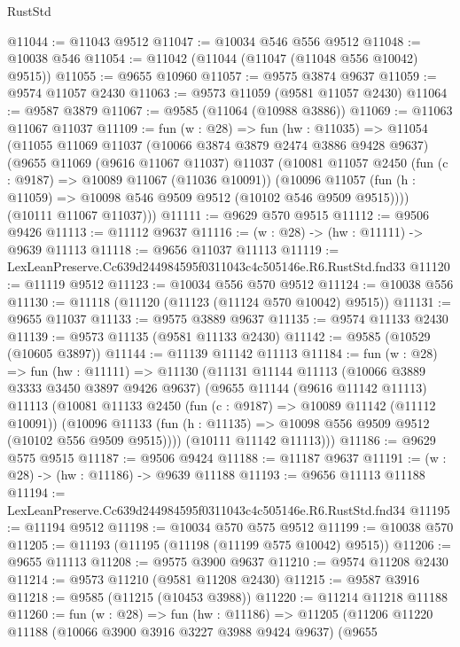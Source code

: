 \begin{lexlean}{RustStd}
\begin{coremodule}
@11044 := @11043 @9512
@11047 := @10034 @546 @556 @9512
@11048 := @10038 @546
@11054 := @11042 (@11044 (@11047 (@11048 @556 @10042) @9515))
@11055 := @9655 @10960
@11057 := @9575 @3874 @9637
@11059 := @9574 @11057 @2430
@11063 := @9573 @11059 (@9581 @11057 @2430)
@11064 := @9587 @3879
@11067 := @9585 (@11064 (@10988 @3886))
@11069 := @11063 @11067 @11037
@11109 := fun (w : @28) =>
  fun (hw : @11035) =>
  @11054
    (@11055
      @11069
      @11037
      (@10066 @3874 @3879 @2474 @3886 @9428 @9637)
      (@9655
        @11069
        (@9616 @11067 @11037)
        @11037
        (@10081
          @11057
          @2450
          (fun (c : @9187) => @10089 @11067 (@11036 @10091))
          (@10096 @11057 (fun (h : @11059) => @10098 @546 @9509 @9512 (@10102 @546 @9509 @9515))))
        (@10111 @11067 @11037)))
@11111 := @9629 @570 @9515
@11112 := @9506 @9426
@11113 := @11112 @9637
@11116 := (w : @28) -> (hw : @11111) -> @9639 @11113
@11118 := @9656 @11037 @11113
@11119 := LexLeanPreserve.Cc639d244984595f0311043c4c505146e.R6.RustStd.fnd33
@11120 := @11119 @9512
@11123 := @10034 @556 @570 @9512
@11124 := @10038 @556
@11130 := @11118 (@11120 (@11123 (@11124 @570 @10042) @9515))
@11131 := @9655 @11037
@11133 := @9575 @3889 @9637
@11135 := @9574 @11133 @2430
@11139 := @9573 @11135 (@9581 @11133 @2430)
@11142 := @9585 (@10529 (@10605 @3897))
@11144 := @11139 @11142 @11113
@11184 := fun (w : @28) =>
  fun (hw : @11111) =>
  @11130
    (@11131
      @11144
      @11113
      (@10066 @3889 @3333 @3450 @3897 @9426 @9637)
      (@9655
        @11144
        (@9616 @11142 @11113)
        @11113
        (@10081
          @11133
          @2450
          (fun (c : @9187) => @10089 @11142 (@11112 @10091))
          (@10096 @11133 (fun (h : @11135) => @10098 @556 @9509 @9512 (@10102 @556 @9509 @9515))))
        (@10111 @11142 @11113)))
@11186 := @9629 @575 @9515
@11187 := @9506 @9424
@11188 := @11187 @9637
@11191 := (w : @28) -> (hw : @11186) -> @9639 @11188
@11193 := @9656 @11113 @11188
@11194 := LexLeanPreserve.Cc639d244984595f0311043c4c505146e.R6.RustStd.fnd34
@11195 := @11194 @9512
@11198 := @10034 @570 @575 @9512
@11199 := @10038 @570
@11205 := @11193 (@11195 (@11198 (@11199 @575 @10042) @9515))
@11206 := @9655 @11113
@11208 := @9575 @3900 @9637
@11210 := @9574 @11208 @2430
@11214 := @9573 @11210 (@9581 @11208 @2430)
@11215 := @9587 @3916
@11218 := @9585 (@11215 (@10453 @3988))
@11220 := @11214 @11218 @11188
@11260 := fun (w : @28) =>
  fun (hw : @11186) =>
  @11205
    (@11206
      @11220
      @11188
      (@10066 @3900 @3916 @3227 @3988 @9424 @9637)
      (@9655

\end{coremodule}
\end{lexlean}
